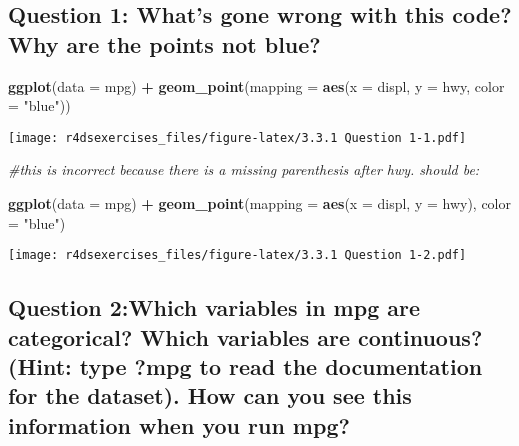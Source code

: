 \documentclass[
]{book}
\newenvironment{Shaded}{\begin{snugshade}}{\end{snugshade}}
\newcommand{\CommentTok}[1]{\textcolor[rgb]{0.56,0.35,0.01}{\textit{#1}}}
\newcommand{\DataTypeTok}[1]{\textcolor[rgb]{0.13,0.29,0.53}{#1}}
\newcommand{\KeywordTok}[1]{\textcolor[rgb]{0.13,0.29,0.53}{\textbf{#1}}}
\newcommand{\NormalTok}[1]{#1}
\newcommand{\OperatorTok}[1]{\textcolor[rgb]{0.81,0.36,0.00}{\textbf{#1}}}
\newcommand{\StringTok}[1]{\textcolor[rgb]{0.31,0.60,0.02}{#1}}
\begin{document}
\hypertarget{question-1-whats-gone-wrong-with-this-code-why-are-the-points-not-blue}{%
\subsection{Question 1: What's gone wrong with this code? Why are the points not blue?}\label{question-1-whats-gone-wrong-with-this-code-why-are-the-points-not-blue}}

\begin{Shaded}
\begin{Highlighting}[]
\KeywordTok{ggplot}\NormalTok{(}\DataTypeTok{data =}\NormalTok{ mpg) }\OperatorTok{+}\StringTok{ }
\StringTok{  }\KeywordTok{geom_point}\NormalTok{(}\DataTypeTok{mapping =} \KeywordTok{aes}\NormalTok{(}\DataTypeTok{x =}\NormalTok{ displ, }\DataTypeTok{y =}\NormalTok{ hwy, }\DataTypeTok{color =} \StringTok{"blue"}\NormalTok{))}
\end{Highlighting}
\end{Shaded}

\texttt{[image: r4dsexercises\_files/figure-latex/3.3.1 Question 1-1.pdf]}

\begin{Shaded}
\begin{Highlighting}[]
\CommentTok{#this is incorrect because there is a missing parenthesis after hwy. should be:}

\KeywordTok{ggplot}\NormalTok{(}\DataTypeTok{data =}\NormalTok{ mpg) }\OperatorTok{+}\StringTok{ }
\StringTok{  }\KeywordTok{geom_point}\NormalTok{(}\DataTypeTok{mapping =} \KeywordTok{aes}\NormalTok{(}\DataTypeTok{x =}\NormalTok{ displ, }\DataTypeTok{y =}\NormalTok{ hwy), }\DataTypeTok{color =} \StringTok{"blue"}\NormalTok{)}
\end{Highlighting}
\end{Shaded}

\texttt{[image: r4dsexercises\_files/figure-latex/3.3.1 Question 1-2.pdf]}

\hypertarget{question-2which-variables-in-mpg-are-categorical-which-variables-are-continuous-hint-type-mpg-to-read-the-documentation-for-the-dataset.-how-can-you-see-this-information-when-you-run-mpg}{%
\subsection{Question 2:Which variables in mpg are categorical? Which variables are continuous? (Hint: type ?mpg to read the documentation for the dataset). How can you see this information when you run mpg?}\label{question-2which-variables-in-mpg-are-categorical-which-variables-are-continuous-hint-type-mpg-to-read-the-documentation-for-the-dataset.-how-can-you-see-this-information-when-you-run-mpg}}
\end{document}
